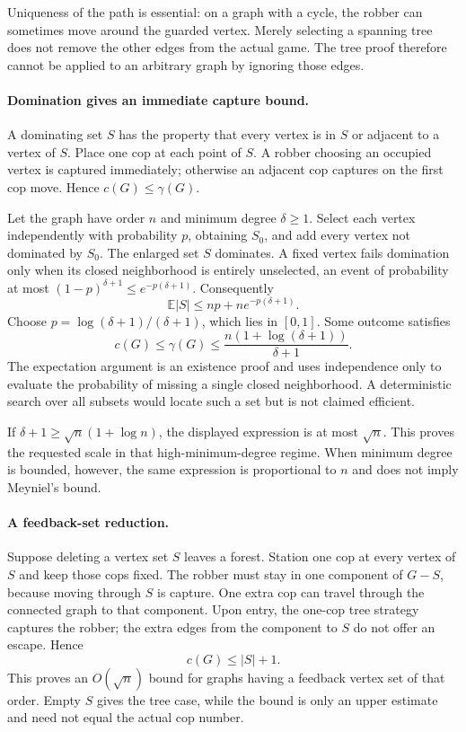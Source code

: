 \documentclass[11pt,a4paper]{article}
\begin{document}
Uniqueness of the path is essential: on a graph with a cycle, the robber can sometimes move around the guarded vertex. Merely selecting a spanning tree does not remove the other edges from the actual game. The tree proof therefore cannot be applied to an arbitrary graph by ignoring those edges.

\paragraph{Domination gives an immediate capture bound.}
A dominating set $S$ has the property that every vertex is in $S$ or adjacent to a vertex of $S$. Place one cop at each point of $S$. A robber choosing an occupied vertex is captured immediately; otherwise an adjacent cop captures on the first cop move. Hence $c(G)\le\gamma(G)$.

Let the graph have order $n$ and minimum degree $\delta\ge1$. Select each vertex independently with probability $p$, obtaining $S_0$, and add every vertex not dominated by $S_0$. The enlarged set $S$ dominates. A fixed vertex fails domination only when its closed neighborhood is entirely unselected, an event of probability at most $(1-p)^{\delta+1}\le e^{-p(\delta+1)}$. Consequently
\[
\mathbb E|S|\le np+ne^{-p(\delta+1)}.
\]
Choose $p=\log(\delta+1)/(\delta+1)$, which lies in $[0,1]$. Some outcome satisfies
\[
c(G)\le\gamma(G)\le
\frac{n(1+\log(\delta+1))}{\delta+1}.
\]
The expectation argument is an existence proof and uses independence only to evaluate the probability of missing a single closed neighborhood. A deterministic search over all subsets would locate such a set but is not claimed efficient.

If $\delta+1\ge\sqrt n(1+\log n)$, the displayed expression is at most $\sqrt n$. This proves the requested scale in that high-minimum-degree regime. When minimum degree is bounded, however, the same expression is proportional to $n$ and does not imply Meyniel's bound.

\paragraph{A feedback-set reduction.}
Suppose deleting a vertex set $S$ leaves a forest. Station one cop at every vertex of $S$ and keep those cops fixed. The robber must stay in one component of $G-S$, because moving through $S$ is capture. One extra cop can travel through the connected graph to that component. Upon entry, the one-cop tree strategy captures the robber; the extra edges from the component to $S$ do not offer an escape. Hence
\[
c(G)\le |S|+1.
\]
This proves an $O(\sqrt n)$ bound for graphs having a feedback vertex set of that order. Empty $S$ gives the tree case, while the bound is only an upper estimate and need not equal the actual cop number.
\end{document}
